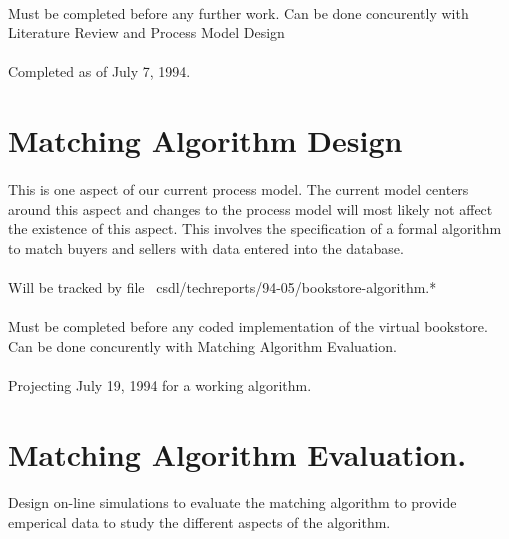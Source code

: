 \begin{noindent}
\paragraph{}Must be completed before any further work.  Can be done concurently with
Literature Review and Process Model Design

\paragraph{}Completed as of July 7, 1994.

\section{Matching Algorithm Design}

\paragraph{}This is one aspect of our current process model.  The current model centers
around this aspect and changes to the process model will most likely not affect
the existence of this aspect.  This involves the specification of a formal
algorithm to match buyers and sellers with data entered into the database.

\paragraph{}Will be tracked by file ~csdl/techreports/94-05/bookstore-algorithm.*

\paragraph{}Must be completed before any coded implementation of the virtual bookstore.
Can be done concurently with Matching Algorithm Evaluation.

\paragraph{}Projecting July 19, 1994 for a working algorithm.

\section{Matching Algorithm Evaluation.}

\paragraph{}Design on-line simulations to evaluate the matching algorithm to provide
emperical data to study the different aspects of the algorithm.


\end{noindent}
